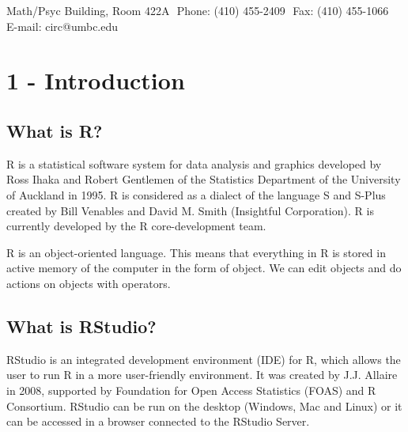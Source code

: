 \documentclass[a4paper]{report}
\begin{document}
        \begin{flushleft}
        Math/Psyc Building, Room 422A 
        \newline Phone: (410) 455-2409 
        \newline Fax: (410) 455-1066 
        \newline E-mail: circ@umbc.edu
    \end{flushleft}

\setcounter{page}{2}
\tableofcontents
\chapter{1 - Introduction}
    \section{What is R?}
    
        \begin{flushleft}
        R is a statistical software system for data analysis and graphics developed by Ross Ihaka and Robert Gentlemen of the Statistics Department of the University of Auckland in 1995. R is considered as a dialect of the language S and S-Plus created by Bill Venables and David M. Smith (Insightful Corporation). R is currently developed by the R core-development team.
        \end{flushleft}
        
        \begin{flushleft}
        R is an object-oriented language. This means that everything in R is stored in active memory of the computer in the form of object. We can edit objects and do actions on objects with operators.
        \end{flushleft}
        
    \section{What is RStudio?}
    
        \begin{flushleft}
       RStudio is an integrated development environment (IDE) for R, which allows the user to run R in a more user-friendly environment. It was created by J.J. Allaire in 2008, supported by Foundation for Open Access Statistics (FOAS) and R Consortium. RStudio can be run on the desktop (Windows, Mac and Linux) or it can be accessed in a browser connected to the RStudio Server.
        \end{flushleft}
        
\end{document}
